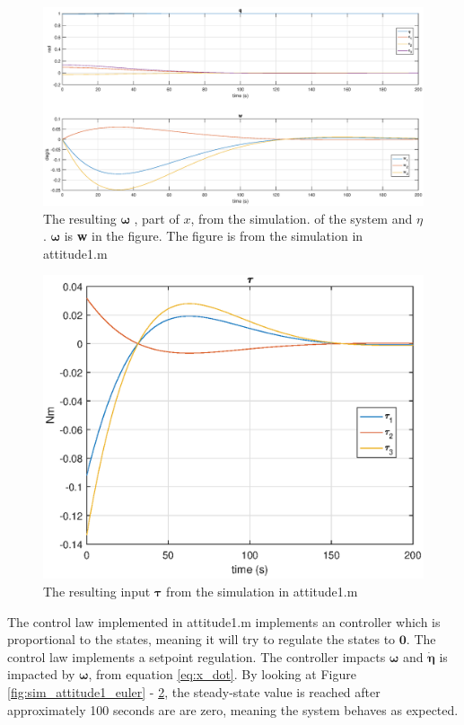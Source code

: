 \begin{figure}[htb!]
	\centering
	\includegraphics[width=1.00\textwidth]{figures/1_q.eps}
	\caption{ The resulting $ \boldsymbol{\omega}$ , part of $x$, from the simulation.  of the system and $\eta$. $\boldsymbol{\omega}$ is \textbf{w} in the figure. The figure is from the simulation in {\color{blue}attitude1.m}}
\label{fig:sim_attitude1_q}
\end{figure}

\begin{figure}[htb!]
	\centering
	\includegraphics[width=1.00\textwidth]{figures/1_tau.eps}
	\caption{The resulting input $\boldsymbol{\tau}$ from the simulation in {\color{blue}attitude1.m}}
\label{fig:sim_attitude1_tau}
\end{figure}

The control law implemented in {\color{blue} attitude1.m} implements an  controller which is proportional to the states, meaning it will try to regulate  the states to $\mathbf{0}$. The control law implements a setpoint regulation. The controller impacts $\boldsymbol{\omega}$ and  $\dot{\mathbf{\eta}}$ is impacted by $\boldsymbol{\omega}$, from equation \eqref{eq:x_dot}.   By looking at Figure \ref{fig:sim_attitude1_euler} - \ref{fig:sim_attitude1_tau}, the steady-state value is reached after approximately 100 seconds are are zero, meaning the system behaves as expected. 


